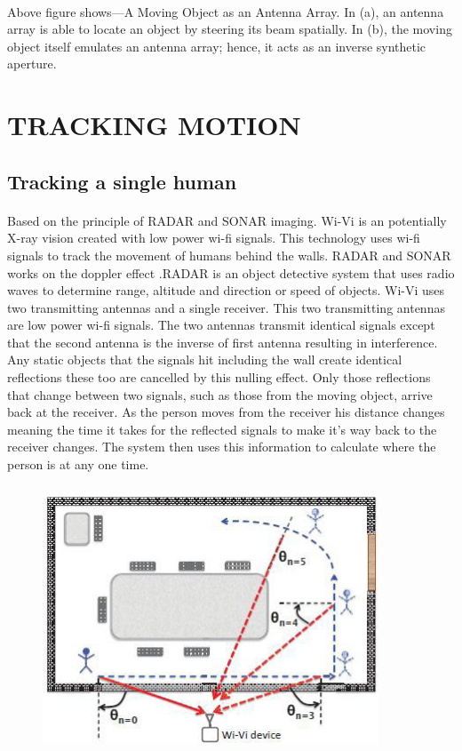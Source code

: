 \documentclass[a4paper,12pt,oneside]{article}
\begin{document}
\paragraph{}
Above figure shows—A Moving Object as an Antenna Array. In (a), an antenna array is able to locate
an object by steering its beam spatially. In (b), the moving object itself emulates an antenna
array; hence, it acts as an inverse synthetic aperture.

\newpage
\section{TRACKING MOTION}
\subsection{Tracking a single human}
\paragraph{}
Based on the principle of RADAR and SONAR imaging. Wi-Vi is an potentially X-ray
vision created with low power wi-fi signals. This technology uses wi-fi signals to track the
movement of humans behind the walls. RADAR and SONAR works on the doppler effect
.RADAR is an object detective system that uses radio waves to determine range, altitude and
direction or speed of objects. Wi-Vi uses two transmitting antennas and a single receiver. This
two transmitting antennas are low power wi-fi signals. The two antennas transmit identical
signals except that the second antenna is the inverse of first antenna resulting in interference.
Any static objects that the signals hit including the wall create identical reflections these too are
cancelled by this nulling effect. Only those reflections that change between two signals, such as
those from the moving object, arrive back at the receiver. As the person moves from the receiver
his distance changes meaning the time it takes for the reflected signals to make it’s way back to
the receiver changes. The system then uses this information to calculate where the person is at
any one time.

\begin{figure}[H]
\centering
\includegraphics[height=8cm,width=10cm]{5.png}
\end{figure}
\end{document}
